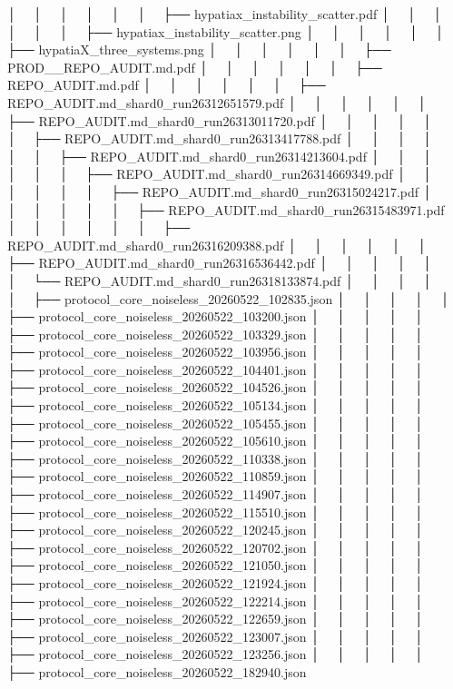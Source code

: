 │   │       │   │   │   │   ├── hypatiax_instability_scatter.pdf
│   │       │   │   │   │   ├── hypatiax_instability_scatter.png
│   │       │   │   │   │   ├── hypatiaX_three_systems.png
│   │       │   │   │   │   ├── PROD__REPO_AUDIT.md.pdf
│   │       │   │   │   │   ├── REPO_AUDIT.md.pdf
│   │       │   │   │   │   ├── REPO_AUDIT.md_shard0_run26312651579.pdf
│   │       │   │   │   │   ├── REPO_AUDIT.md_shard0_run26313011720.pdf
│   │       │   │   │   │   ├── REPO_AUDIT.md_shard0_run26313417788.pdf
│   │       │   │   │   │   ├── REPO_AUDIT.md_shard0_run26314213604.pdf
│   │       │   │   │   │   ├── REPO_AUDIT.md_shard0_run26314669349.pdf
│   │       │   │   │   │   ├── REPO_AUDIT.md_shard0_run26315024217.pdf
│   │       │   │   │   │   ├── REPO_AUDIT.md_shard0_run26315483971.pdf
│   │       │   │   │   │   ├── REPO_AUDIT.md_shard0_run26316209388.pdf
│   │       │   │   │   │   ├── REPO_AUDIT.md_shard0_run26316536442.pdf
│   │       │   │   │   │   └── REPO_AUDIT.md_shard0_run26318133874.pdf
│   │       │   │   │   ├── protocol_core_noiseless_20260522_102835.json
│   │       │   │   │   ├── protocol_core_noiseless_20260522_103200.json
│   │       │   │   │   ├── protocol_core_noiseless_20260522_103329.json
│   │       │   │   │   ├── protocol_core_noiseless_20260522_103956.json
│   │       │   │   │   ├── protocol_core_noiseless_20260522_104401.json
│   │       │   │   │   ├── protocol_core_noiseless_20260522_104526.json
│   │       │   │   │   ├── protocol_core_noiseless_20260522_105134.json
│   │       │   │   │   ├── protocol_core_noiseless_20260522_105455.json
│   │       │   │   │   ├── protocol_core_noiseless_20260522_105610.json
│   │       │   │   │   ├── protocol_core_noiseless_20260522_110338.json
│   │       │   │   │   ├── protocol_core_noiseless_20260522_110859.json
│   │       │   │   │   ├── protocol_core_noiseless_20260522_114907.json
│   │       │   │   │   ├── protocol_core_noiseless_20260522_115510.json
│   │       │   │   │   ├── protocol_core_noiseless_20260522_120245.json
│   │       │   │   │   ├── protocol_core_noiseless_20260522_120702.json
│   │       │   │   │   ├── protocol_core_noiseless_20260522_121050.json
│   │       │   │   │   ├── protocol_core_noiseless_20260522_121924.json
│   │       │   │   │   ├── protocol_core_noiseless_20260522_122214.json
│   │       │   │   │   ├── protocol_core_noiseless_20260522_122659.json
│   │       │   │   │   ├── protocol_core_noiseless_20260522_123007.json
│   │       │   │   │   ├── protocol_core_noiseless_20260522_123256.json
│   │       │   │   │   ├── protocol_core_noiseless_20260522_182940.json
